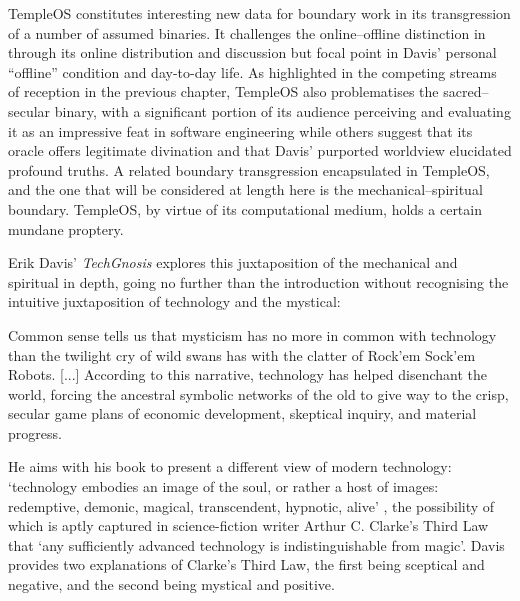 TempleOS constitutes interesting new data for boundary work in its
transgression of a number of assumed binaries.
It challenges the online--offline distinction in through its online
distribution and discussion but focal point in Davis' personal
``offline'' condition and day-to-day life.
As highlighted in the competing streams of reception in the previous chapter,
TempleOS also problematises the sacred--secular binary,
with a significant portion of its audience perceiving and evaluating it
as an impressive feat in software engineering while others suggest
that its oracle offers legitimate divination and that Davis'
purported worldview elucidated profound truths.
A related boundary transgression encapsulated in TempleOS,
and the one that will be considered at length here
is the mechanical--spiritual boundary.
TempleOS, by virtue of its computational medium, holds a certain
mundane proptery.

Erik Davis' \parencite*[2--3]{Davis98} \textit{TechGnosis} explores this
juxtaposition of the mechanical and spiritual in depth,
going no further than the introduction without recognising the intuitive
juxtaposition of technology and the mystical:
\begin{displayquote}
  Common sense tells us that mysticism has no more in common with technology
  than the twilight cry of wild swans has with
  the clatter of Rock'em Sock'em Robots. [...]
  According to this narrative, technology has helped disenchant the world,
  forcing the ancestral symbolic networks of the old to give way to the crisp,
  secular game plans of economic development, skeptical inquiry,
  and material progress.
\end{displayquote}
He aims with his book to present a different view of modern technology:
`technology embodies an image of the soul, or rather a host of images:
redemptive, demonic, magical, transcendent, hypnotic, alive'
\parencite[9]{Davis98}, the possibility of which is aptly captured in
science-fiction writer Arthur C. Clarke's \parencite*[21]{Clarke73} Third Law
that `any sufficiently advanced technology is indistinguishable from magic'.
Davis provides two explanations of Clarke's Third Law, the first being
sceptical and negative, and the second being mystical and positive.


